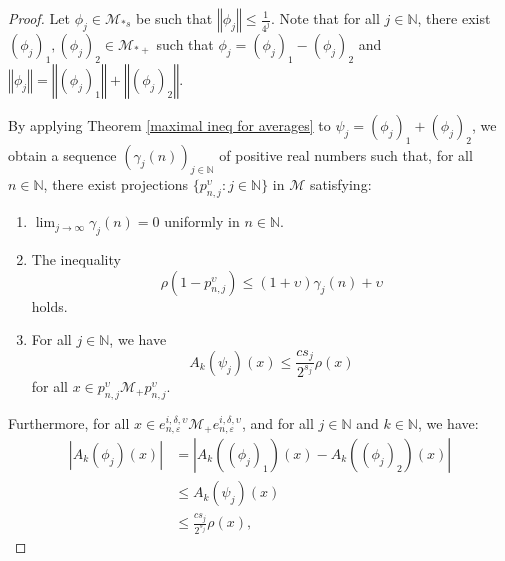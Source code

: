 \documentclass[11pt]{amsart}
\theoremstyle{definition}
\theoremstyle{myremark}
\numberwithin{equation}{section}
\def\N{\mathbb N}
\newcommand{\CM}{\mathcal{M}}
\newcommand{\eps}{\varepsilon}
\newcommand{\ups}{\upsilon}
\newcommand{\abs}[1]{\left\vert#1\right\vert}
\newcommand{\norm}[1]{\left\Vert#1\right\Vert}
\begin{document}
\begin{proof}
	Let $\phi_j \in \CM_{*s}$ be such that $\norm{\phi_j} \leq \frac{1}{4^j}$. Note that for all $j \in \N$, there exist $(\phi_j)_1, (\phi_j)_2 \in \CM_{*+}$ such that $\phi_j = (\phi_j)_1 - (\phi_j)_2$ and $\norm{\phi_j} = \norm{(\phi_j)_1} + \norm{(\phi_j)_2}$. 
	
	By applying Theorem \ref{maximal ineq for averages} to $\psi_j = (\phi_j)_1 + (\phi_j)_2$, we obtain a sequence $(\gamma_j(n))_{j \in \N}$ of positive real numbers such that, for all $n \in \N$, there exist projections $\{p^{\ups}_{n,j}: j \in \N\}$ in $\CM$ satisfying:
	\begin{enumerate}\setlength\itemsep{.7em}       
		\item $\displaystyle \lim_{j \to \infty} \gamma_j (n) = 0$ uniformly in $n \in \N$.
		\item The inequality
		\[
		\rho(1 - p^{\ups}_{n,j}) \leq (1 + \ups) \gamma_j(n) + \ups
		\]
		holds.
		\item For all $j \in \N$, we have
		\[
		A_k(\psi_j)(x) \leq \frac{cs_j}{2^{s_j}} \rho(x)
		\]
		for all $x \in p^{\ups}_{n,j} \CM_+ p^{\ups}_{n,j}$.
	\end{enumerate}
	
	
	Furthermore, for all $x \in e^{i, \delta, \ups}_{n, \eps} \CM_+ e^{i, \delta, \ups}_{n, \eps}$, and for all $j \in \N$ and $k \in \N$, we have:
	\begin{align*}
		\abs{A_k(\phi_j)(x)}
		&= \abs{A_k((\phi_j)_1)(x) - A_k((\phi_j)_2)(x)}\\
		&\leq A_k(\psi_j)(x)\\
		&\leq \frac{cs_{j}}{2^{s_j}} \rho(x),
	\end{align*}
	
\end{proof}
\end{document}
